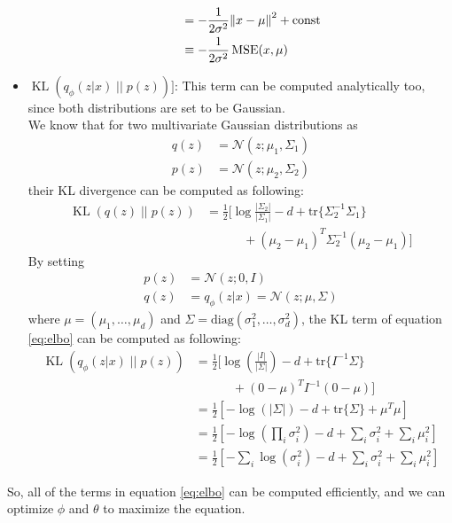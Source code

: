 \documentclass{article}
\newcommand{\kl}[2]{\operatorname{KL}({#1} \; || \; {#2})}
\begin{document}
\begin{itemize}
\begin{itemize}
\begin{equation}
\begin{alignedat}{6}
						\span \span &&& = - {\frac {1}{2 \sigma^2}} {\Vert x - \mu \Vert}^2 + \text{const} \\
						\span \span &&& \equiv - {\frac {1}{2 \sigma^2}} \, \text{MSE}(x, \mu)
					\end{alignedat}
				\end{equation}
		\end{itemize}
	\item $\kl{q_\phi(z|x)}{p(z)}]$:
		This term can be computed analytically too, since both distributions are set to be Gaussian. \\
		We know that for two multivariate Gaussian distributions as
		\begin{equation}
			\begin{alignedat}{2}
				q(z) &= \mathcal{N}(z; \mu_1, \Sigma_1)  \\
				p(z) &= \mathcal{N}(z; \mu_2, \Sigma_2)
			\end{alignedat}
		\end{equation}
		their KL divergence can be computed as following:
		\begin{equation}
			\begin{alignedat}{2}
				\kl{q(z)}{p(z)} &= \frac{1}{2} \biggl[ \log\frac{|\Sigma_2|}{|\Sigma_1|} - d + \text{tr} \{ \Sigma_2^{-1}\Sigma_1 \} \\
				& \qquad \quad  + (\mu_2 - \mu_1)^T \Sigma_2^{-1}(\mu_2 - \mu_1) \biggr]
			\end{alignedat}
		\end{equation}
		By setting
		\begin{equation}
			\begin{alignedat}{2}
				p(z) &= \mathcal{N}(z; 0, I) \\
				q(z) &= q_\phi(z|x) = \mathcal{N}(z; \mu, \Sigma)
			\end{alignedat}
		\end{equation}		
		where $\mu = (\mu_1, \dots, \mu_d)$ and $\Sigma = \text{diag}(\sigma_1^2, \dots, \sigma_d^2)$, the KL term of equation \ref{eq:elbo} can be computed as following:
		\begin{equation}
			\begin{alignedat}{2}
				\kl{q_\phi(z|x)}{p(z)} & = \frac{1}{2} \biggl[ \log(\frac{|I|}{|\Sigma|}) - d + \text{tr} \{ I^{-1}\Sigma \} \\
				& \qquad \quad + (0 - \mu)^T I^{-1}(0 - \mu) \biggr] \\
                & = \frac{1}{2}\left[-\log({|\Sigma|}) - d + \text{tr} \{ \Sigma \} + \mu^T \mu\right] \\
                & = \frac{1}{2}\left[-\log(\prod_i\sigma_i^2) - d + \sum_i\sigma_i^2 + \sum_i\mu^2_i\right] \\
                & = \frac{1}{2}\left[-\sum_i\log(\sigma_i^2) - d + \sum_i\sigma_i^2 + \sum_i\mu^2_i\right]
			\end{alignedat}
		\end{equation}
\end{itemize}
So, all of the terms in equation \ref{eq:elbo} can be computed efficiently, and we can optimize $\phi$ and $\theta$ to maximize the equation.
\end{document}
